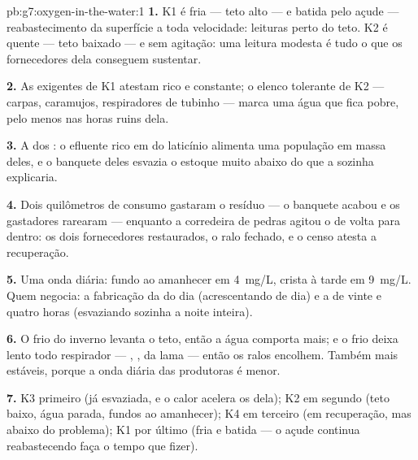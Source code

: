 \begin{solution}{pb:g7:oxygen-in-the-water:1}
\textbf{1.} K1 é fria --- teto alto --- e batida pelo açude ---
reabastecimento da superfície a toda velocidade: leituras perto do
teto. K2 é quente --- teto baixado --- e sem agitação: uma leitura
modesta é tudo o que os fornecedores dela conseguem sustentar.

\textbf{2.} As  exigentes de K1 atestam  rico e
constante; o elenco tolerante de K2 --- carpas, caramujos, respiradores
de tubinho --- marca uma água que fica pobre, pelo menos nas horas
ruins dela.

\textbf{3.} A  dos : o efluente rico em
 do laticínio alimenta uma população em massa deles, e
o banquete deles esvazia o estoque muito abaixo do que a 
sozinha explicaria.

\textbf{4.} Dois quilômetros de consumo gastaram o resíduo --- o
banquete acabou e os gastadores rarearam --- enquanto a corredeira de
pedras agitou o  de volta para dentro: os dois fornecedores
restaurados, o ralo fechado, e o censo atesta a recuperação.

\textbf{5.} Uma onda diária: fundo ao amanhecer em \qty{4}{mg/L},
crista à tarde em \qty{9}{mg/L}. Quem negocia: a fabricação da  do
dia (acrescentando de dia) e a  de vinte e quatro horas
(esvaziando sozinha a noite inteira).

\textbf{6.} O frio do inverno levanta o teto, então a água comporta
mais; e o frio deixa lento todo respirador --- , ,
 da lama --- então os ralos encolhem. Também mais
estáveis, porque a onda diária das produtoras é menor.

\textbf{7.} K3 primeiro (já esvaziada, e o calor acelera os
 dela); K2 em segundo (teto baixo, água parada, fundos
ao amanhecer); K4 em terceiro (em recuperação, mas abaixo do
problema); K1 por último (fria e batida --- o açude continua
reabastecendo faça o tempo que fizer).


\end{solution}

